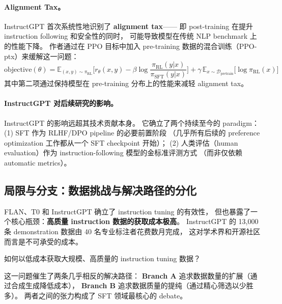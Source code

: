 \paragraph{Alignment Tax。}
InstructGPT 首次系统性地识别了 \textbf{alignment tax}——
即 post-training 在提升 instruction following 和安全性的同时，
可能导致模型在传统 NLP benchmark 上的性能下降。
作者通过在 PPO 目标中加入 pre-training 数据的混合训练（PPO-ptx）来缓解这一问题：
\[
  \text{objective}(\theta) =
    \mathbb{E}_{(x,y) \sim \pi_{\text{RL}}} \big[ r_\theta(x,y) - \beta \log \frac{\pi_{\text{RL}}(y|x)}{\pi_{\text{SFT}}(y|x)} \big]
    + \gamma \, \mathbb{E}_{x \sim \mathcal{D}_{\text{pretrain}}} \big[ \log \pi_{\text{RL}}(x) \big]
\]
其中第二项通过保持模型在 pre-training 分布上的性能来减轻 alignment tax。

\paragraph{InstructGPT 对后续研究的影响。}
InstructGPT 的影响远超其技术贡献本身。
它确立了两个持续至今的 paradigm：
(1) SFT 作为 RLHF/DPO pipeline 的必要前置阶段
（几乎所有后续的 preference optimization 工作都从一个 SFT checkpoint 开始）；
(2) 人类评估（human evaluation）作为 instruction-following 模型的金标准评测方式
（而非仅依赖 automatic metrics）。


\subsection{局限与分支：数据挑战与解决路径的分化}
\label{sec:t1-branching}

FLAN、T0 和 InstructGPT 确立了 instruction tuning 的有效性，
但也暴露了一个核心瓶颈：\textbf{高质量 instruction 数据的获取成本极高}。
InstructGPT 的 13,000 条 demonstration 数据由 40 名专业标注者花费数月完成，
这对学术界和开源社区而言是不可承受的成本。

\begin{problembox}
如何以低成本获取大规模、高质量的 instruction tuning 数据？
\end{problembox}

这一问题催生了两条几乎相反的解决路径：
\textbf{Branch A} 追求数据数量的扩展（通过合成生成降低成本），
\textbf{Branch B} 追求数据质量的提纯（通过精心筛选以少胜多）。
两者之间的张力构成了 SFT 领域最核心的 debate。




